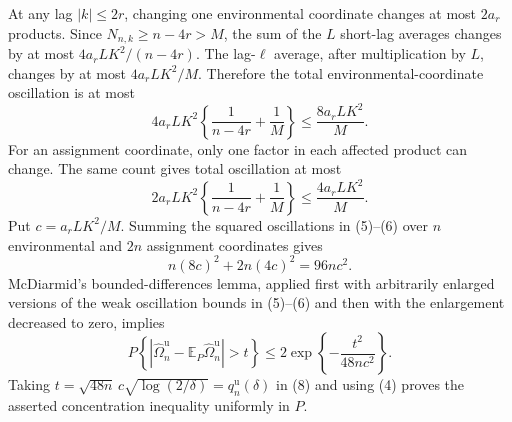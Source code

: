 At any lag \(|k|\le2r\), changing one environmental coordinate changes at most \(2a_r\) products.  Since \(N_{n,k}\ge n-4r>M\), the sum of the \(L\) short-lag averages changes by at most \(4a_rLK^2/(n-4r)\).  The lag-\(\ell\) average, after multiplication by \(L\), changes by at most \(4a_rLK^2/M\).  Therefore the total environmental-coordinate oscillation is at most
\[
 4a_rLK^2\left\{\frac1{n-4r}+\frac1M\right\}
 \le \frac{8a_rLK^2}{M}. \tag{5}
\]
For an assignment coordinate, only one factor in each affected product can change.  The same count gives total oscillation at most
\[
 2a_rLK^2\left\{\frac1{n-4r}+\frac1M\right\}
 \le \frac{4a_rLK^2}{M}. \tag{6}
\]
Put \(c=a_rLK^2/M\).  Summing the squared oscillations in (5)--(6) over \(n\) environmental and \(2n\) assignment coordinates gives
\[
 n(8c)^2+2n(4c)^2=96nc^2. \tag{7}
\]
McDiarmid's bounded-differences lemma, applied first with arbitrarily enlarged versions of the weak oscillation bounds in (5)--(6) and then with the enlargement decreased to zero, implies
\[
 P\!\left\{\left|\widehat\Omega_n^{\mathrm u}
 -\mathbb E_P\widehat\Omega_n^{\mathrm u}\right|>t\right\}
 \le2\exp\!\left\{-\frac{t^2}{48nc^2}\right\}. \tag{8}
\]
Taking \(t=\sqrt{48n}\,c\sqrt{\log(2/\delta)}=q_n^{\mathrm u}(\delta)\) in (8) and using (4) proves the asserted concentration inequality uniformly in \(P\).

